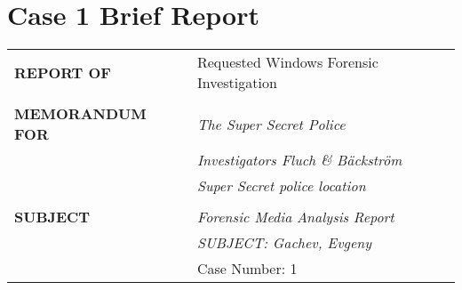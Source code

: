 
\section{Case 1 Brief Report}


\begin{longtable}{p{}p{}}
\textbf{REPORT OF} & Requested Windows Forensic Investigation\\
&\\
\textbf{MEMORANDUM FOR} & \textit{The Super Secret Police} \\
			& \textit{Investigators Fluch \& Bäckström} \\
   & \textit{Super Secret police location}\\
&\\
\textbf{SUBJECT} & \textit{Forensic Media Analysis Report}\\
& \textit{SUBJECT: Gachev, Evgeny}\\
& Case Number: 1\\
\end{longtable}

